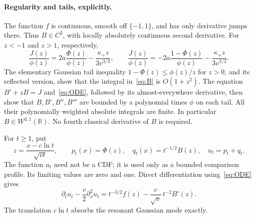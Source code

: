 \documentclass[11pt]{article}
\newcommand{\R}{\mathbb R}
\begin{document}
\paragraph{Regularity and tails, explicitly.}
The function $f$ is continuous, smooth off $\{-1,1\}$, and has only
derivative jumps there. Thus $B\in C^2$, with locally absolutely
continuous second derivative. For $z<-1$ and $z>1$, respectively,
\[
 \frac{J(z)}{\phi(z)}=
 2a\frac{\Phi(z)}{\phi(z)}-\frac{\kappa_+z}{3v^{3/2}},
 \qquad
 \frac{J(z)}{\phi(z)}=
 -2a\frac{1-\Phi(z)}{\phi(z)}-\frac{\kappa_+z}{3v^{3/2}}.
\]
The elementary Gaussian tail inequality
$1-\Phi(z)\le\phi(z)/z$ for $z>0$, and its reflected version,
show that the integral in~\eqref{eq:B} is $O(1+z^2)$.
The equation $B'+zB=J$ and~\eqref{eq:ODE}, followed by its
almost-everywhere derivative, then show that $B,B',B'',B'''$ are
bounded by a polynomial times $\phi$ on each tail. All their
polynomially weighted absolute integrals are finite. In particular
$B\in W^{3,1}(\R)$. No fourth classical derivative of $B$ is required.

For $t\ge1$, put
\begin{equation}\label{eq:profile}
 z=\frac{x-c\ln t}{\sqrt{vt}},\qquad
 p_t(x)=\Phi(z),\quad q_t(x)=t^{-1/2}B(z),\quad u_t=p_t+q_t.
\end{equation}
The function $u_t$ need not be a CDF; it is used only as a bounded
comparison profile. Its limiting values are zero and one. Direct
differentiation using~\eqref{eq:ODE} gives
\begin{equation}\label{eq:PDE}
 \partial_tu_t-\frac v2\partial_x^2u_t
 =t^{-3/2}f(z)-\frac{c}{\sqrt v}\,t^{-2}B'(z).
\end{equation}
The translation $c\ln t$ absorbs the resonant Gaussian mode exactly.
\end{document}
